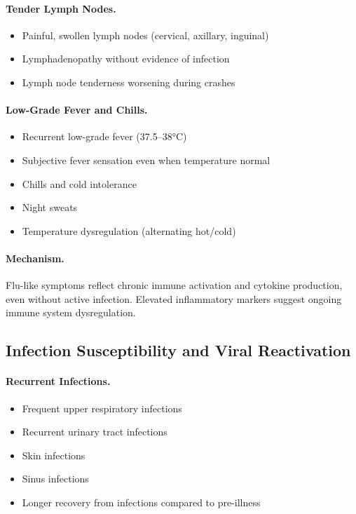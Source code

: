 \paragraph{Tender Lymph Nodes.}
\begin{itemize}
    \item Painful, swollen lymph nodes (cervical, axillary, inguinal)
    \item Lymphadenopathy without evidence of infection
    \item Lymph node tenderness worsening during crashes
\end{itemize}

\paragraph{Low-Grade Fever and Chills.}
\begin{itemize}
    \item Recurrent low-grade fever (37.5--38°C)
    \item Subjective fever sensation even when temperature normal
    \item Chills and cold intolerance
    \item Night sweats
    \item Temperature dysregulation (alternating hot/cold)
\end{itemize}

\paragraph{Mechanism.}
Flu-like symptoms reflect chronic immune activation and cytokine production, even without active infection. Elevated inflammatory markers suggest ongoing immune system dysregulation.

\subsection{Infection Susceptibility and Viral Reactivation}
\label{subsec:infections}

\paragraph{Recurrent Infections.}
\begin{itemize}
    \item Frequent upper respiratory infections
    \item Recurrent urinary tract infections
    \item Skin infections
    \item Sinus infections
    \item Longer recovery from infections compared to pre-illness
\end{itemize}

